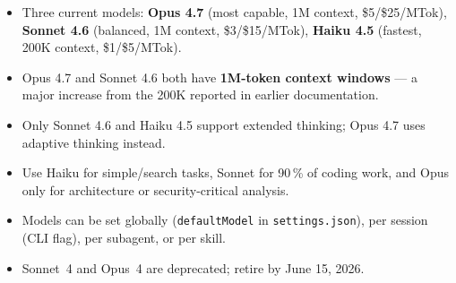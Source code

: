 \begin{summarybox}
\begin{itemize}
  \item Three current models: \textbf{Opus 4.7} (most capable, 1M context,
        \$5/\$25/MTok), \textbf{Sonnet 4.6} (balanced, 1M context,
        \$3/\$15/MTok), \textbf{Haiku 4.5} (fastest, 200K context,
        \$1/\$5/MTok).
  \item Opus 4.7 and Sonnet 4.6 both have \textbf{1M-token context windows}
        — a major increase from the 200K reported in earlier documentation.
  \item Only Sonnet 4.6 and Haiku 4.5 support extended thinking; Opus 4.7
        uses adaptive thinking instead.
  \item Use Haiku for simple/search tasks, Sonnet for 90\,\% of coding work,
        and Opus only for architecture or security-critical analysis.
  \item Models can be set globally (\texttt{defaultModel} in
        \texttt{settings.json}), per session (CLI flag), per subagent, or
        per skill.
  \item Sonnet~4 and Opus~4 are deprecated; retire by June 15, 2026.
\end{itemize}
\end{summarybox}

\nocite{*}
\printbibliography[heading=subbibliography,title={References}]
